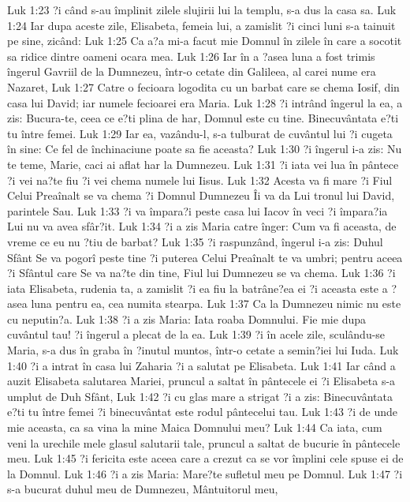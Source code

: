 Luk 1:23  ?i când s-au împlinit zilele slujirii lui la templu, s-a dus la casa sa.
Luk 1:24  Iar dupa aceste zile, Elisabeta, femeia lui, a zamislit ?i cinci luni s-a tainuit pe sine, zicând:
Luk 1:25  Ca a?a mi-a facut mie Domnul în zilele în care a socotit sa ridice dintre oameni ocara mea.
Luk 1:26  Iar în a ?asea luna a fost trimis îngerul Gavriil de la Dumnezeu, într-o cetate din Galileea, al carei nume era Nazaret,
Luk 1:27  Catre o fecioara logodita cu un barbat care se chema Iosif, din casa lui David; iar numele fecioarei era Maria.
Luk 1:28  ?i intrând îngerul la ea, a zis: Bucura-te, ceea ce e?ti plina de har, Domnul este cu tine. Binecuvântata e?ti tu între femei.
Luk 1:29  Iar ea, vazându-l, s-a tulburat de cuvântul lui ?i cugeta în sine: Ce fel de închinaciune poate sa fie aceasta?
Luk 1:30  ?i îngerul i-a zis: Nu te teme, Marie, caci ai aflat har la Dumnezeu.
Luk 1:31  ?i iata vei lua în pântece ?i vei na?te fiu ?i vei chema numele lui Iisus.
Luk 1:32  Acesta va fi mare ?i Fiul Celui Preaînalt se va chema ?i Domnul Dumnezeu Îi va da Lui tronul lui David, parintele Sau.
Luk 1:33  ?i va împara?i peste casa lui Iacov în veci ?i împara?ia Lui nu va avea sfâr?it.
Luk 1:34  ?i a zis Maria catre înger: Cum va fi aceasta, de vreme ce eu nu ?tiu de barbat?
Luk 1:35  ?i raspunzând, îngerul i-a zis: Duhul Sfânt Se va pogorî peste tine ?i puterea Celui Preaînalt te va umbri; pentru aceea ?i Sfântul care Se va na?te din tine, Fiul lui Dumnezeu se va chema.
Luk 1:36  ?i iata Elisabeta, rudenia ta, a zamislit ?i ea fiu la batrâne?ea ei ?i aceasta este a ?asea luna pentru ea, cea numita stearpa.
Luk 1:37  Ca la Dumnezeu nimic nu este cu neputin?a.
Luk 1:38  ?i a zis Maria: Iata roaba Domnului. Fie mie dupa cuvântul tau! ?i îngerul a plecat de la ea.
Luk 1:39  ?i în acele zile, sculându-se Maria, s-a dus în graba în ?inutul muntos, într-o cetate a semin?iei lui Iuda.
Luk 1:40  ?i a intrat în casa lui Zaharia ?i a salutat pe Elisabeta.
Luk 1:41  Iar când a auzit Elisabeta salutarea Mariei, pruncul a saltat în pântecele ei ?i Elisabeta s-a umplut de Duh Sfânt,
Luk 1:42  ?i cu glas mare a strigat ?i a zis: Binecuvântata e?ti tu între femei ?i binecuvântat este rodul pântecelui tau.
Luk 1:43  ?i de unde mie aceasta, ca sa vina la mine Maica Domnului meu?
Luk 1:44  Ca iata, cum veni la urechile mele glasul salutarii tale, pruncul a saltat de bucurie în pântecele meu.
Luk 1:45  ?i fericita este aceea care a crezut ca se vor împlini cele spuse ei de la Domnul.
Luk 1:46  ?i a zis Maria: Mare?te sufletul meu pe Domnul.
Luk 1:47  ?i s-a bucurat duhul meu de Dumnezeu, Mântuitorul meu,

